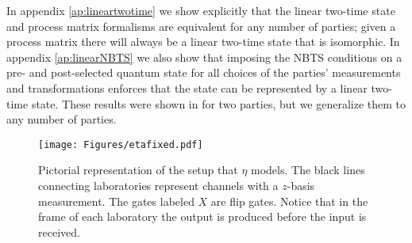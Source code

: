 \documentclass[aps,pra, twocolumn]{revtex4-1}
\begin{document}
In  appendix \ref{ap:lineartwotime} we show explicitly that the linear two-time state and process matrix formalisms are equivalent for any number of parties; given a process matrix there will always be a linear two-time state that is isomorphic. In appendix \ref{ap:linearNBTS} we also show that imposing the NBTS conditions on a pre- and post-selected quantum state for all choices of the parties' measurements and transformations enforces that the state can be represented by a linear two-time state. These results were shown in \cite{connectingprocesandtwotime, polytope} for two parties, but  we generalize them to any number of parties.
\begin{figure*}[ht]
\centering
\texttt{[image: Figures/etafixed.pdf]}
\caption{Pictorial representation of the setup that $\eta$ models. The black lines connecting laboratories represent channels with a $z$-basis measurement. The gates labeled $X$ are flip gates. Notice that in the frame of each laboratory the output is produced before the input is received.\label{fig:eta}}
\end{figure*}
\end{document}
